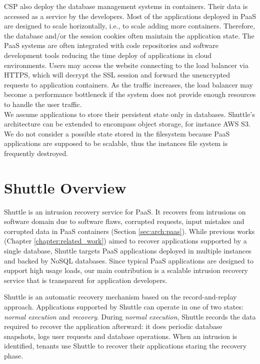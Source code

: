 \acf{CSP} also deploy the database management systems in containers. Their data is accessed as a service by the developers. Most of the applications deployed in \ac{PaaS} are designed to scale horizontally, i.e., to scale adding more containers. Therefore, the database and/or the session cookies often maintain the application state. The \ac{PaaS} systems are often integrated with code repositories and software development tools reducing the time deploy of applications in cloud environments. Users may access the website connecting to the load balancer via \ac{HTTPS}, which will decrypt the \ac{SSL} session and forward the unencrypted requests to application containers. As the traffic increases, the load balancer may become a performance bottleneck if the system does not provide enough resources to handle the user traffic.\\

We assume applications to store their persistent state only in databases. Shuttle's architecture can be extended to encompass object storage, for instance \acf{AWS} \ac{S3}. We do not consider a possible state stored in the filesystem because \ac{PaaS} applications are supposed to be scalable, thus the instances file system is frequently destroyed.

\FloatBarrier
\section{Shuttle Overview}
\label{sec:arch:overview}
Shuttle is an intrusion recovery service for \ac{PaaS}. It recovers from intrusions on software domain due to software flaws, corrupted requests, input mistakes and corrupted data in \ac{PaaS} containers (Section \ref{sec:arch:paas}). While previous works (Chapter \ref{chapter:related_work}) aimed to recover applications supported by a single database, Shuttle targets \ac{PaaS} applications deployed in multiple instances and backed by \acs{NoSQL} databases. Since typical \ac{PaaS} applications are designed to support high usage loads, our main contribution is a scalable intrusion recovery service that is transparent for application developers. 

Shuttle is an automatic recovery mechanism based on the record-and-replay approach. Applications supported by Shuttle can operate in one of two states: \textit{normal execution} and \textit{recovery}. During \emph{normal execution}, Shuttle records the data required to recover the application afterward: it does periodic database snapshots, logs user requests and database operations. When an intrusion is identified, tenants use Shuttle to recover their applications staring the recovery phase.


